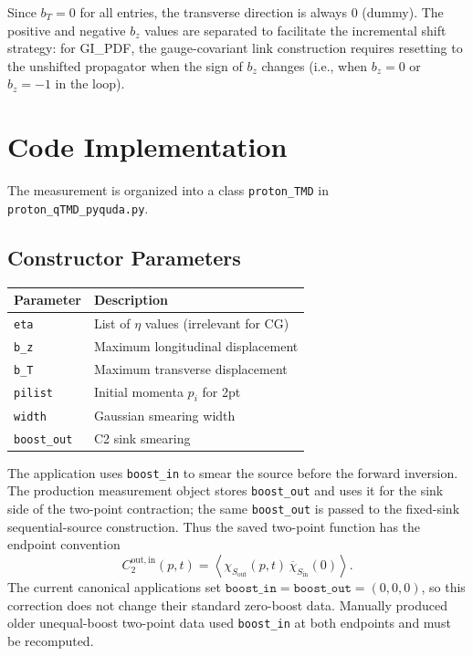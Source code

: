 \documentclass[11pt,a4paper]{article}
\begin{document}
Since $b_T = 0$ for all entries, the transverse direction is always 0 (dummy).
The positive and negative $b_z$ values are separated to facilitate the incremental
shift strategy: for GI\_PDF, the gauge-covariant link construction requires resetting
to the unshifted propagator when the sign of $b_z$ changes (i.e., when $b_z = 0$ or
$b_z = -1$ in the loop).

\section{Code Implementation}
\label{sec:implementation}

The measurement is organized into a class \texttt{proton\_TMD} in
\texttt{proton\_qTMD\_pyquda.py}.

\subsection{Constructor Parameters}

\begin{center}
  \begin{tabular}{l|l}
    Parameter & Description \\
    \hline
    \texttt{eta} & List of $\eta$ values (irrelevant for CG) \\
    \texttt{b\_z} & Maximum longitudinal displacement \\
    \texttt{b\_T} & Maximum transverse displacement \\
    \texttt{pilist} & Initial momenta $p_i$ for 2pt \\
    \texttt{width} & Gaussian smearing width \\
    \texttt{boost\_out} & C2 sink smearing \\
  \end{tabular}
\end{center}

The application uses \texttt{boost\_in} to smear the source before the forward
inversion.  The production measurement object stores \texttt{boost\_out} and
uses it for the sink side of the two-point contraction; the same
\texttt{boost\_out} is passed to the fixed-sink sequential-source
construction.  Thus the saved two-point function has the endpoint convention
\begin{equation}
  C_{2}^{\mathrm{out,in}}(p,t)
  =
  \left\langle
    \chi_{S_{\mathrm{out}}}(p,t)\,
    \overline{\chi}_{S_{\mathrm{in}}}(0)
  \right\rangle .
\end{equation}
The current canonical applications set
\(\texttt{boost\_in}=\texttt{boost\_out}=(0,0,0)\), so this correction does
not change their standard zero-boost data.  Manually produced older
unequal-boost two-point data used \texttt{boost\_in} at both endpoints and
must be recomputed.
\end{document}
